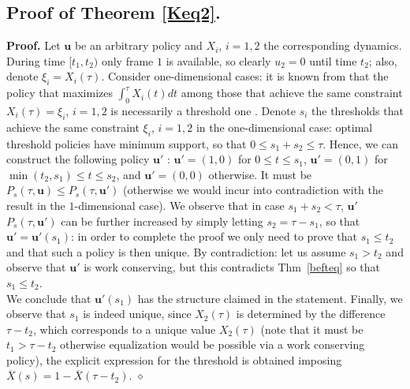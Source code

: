 \documentclass[10pt,twocolumn,conference,final]{IEEEtran}
\def\endpf{\hfill$\diamond$}
\newcommand{\Xu}{\overline X}
\newcommand{\ubf}{\mathbf u}
\begin{document}
\subsection{\bf Proof of Theorem \ref{Keq2}.}
{\bf Proof.} Let $\ubf$ be an arbitrary policy  and $X_i$, $i=1,2$ the corresponding
dynamics. During  time $[ t_1 , t_2)$ only frame $1$ is available, so clearly
$u_2=0$ until time $t_2$; also, denote $\xi_i=X_i(\tau)$. Consider
one-dimensional cases: it is known from \cite{ABD} that the
policy that maximizes $\int_{0}^{\tau} X_i (t)dt$ among those that
achieve the same constraint $X_i(\tau)= \xi_i$, $i=1,2$ is
necessarily a threshold one \cite{ABD}. Denote $s_i$ the
thresholds that achieve the same constraint $\xi_i$, $i=1,2$ in
the one-dimensional case: optimal threshold policies have minimum
support, so that $0\leq s_1+s_2\leq \tau$. Hence,
we can construct the following policy ${\ubf'}$ : ${\ubf'}=(1,0)$
for  $0\leq t \leq s_1$, ${\ubf'}=(0,1)$ for $\min(t_2,s_1)\leq t \leq s_2$,
and ${\ubf'}=(0,0)$ otherwise. It must be $P_s(\tau,\ubf)\leq P_s(\tau,{\ubf'})$
(otherwise we would incur into contradiction with the result \cite{ABD}
in the $1$-dimensional case). We observe that in case $s_1+s_2<\tau$,  ${\ubf'}$
$P_s(\tau,{\ubf'})$ can be further increased by simply letting $s_2=\tau-s_1$,
so that $\ubf'=\ubf'(s_1)$:  in order to complete the proof we only need to
prove that $s_1\leq t_2$ and that such a policy is then unique. By contradiction:
let us assume $s_1>t_2$ and observe that ${\ubf'}$ is work conserving, but this
contradicts Thm~\ref{befteq} so that $s_1 \leq t_2$. \\
We conclude that ${\ubf'}(s_1)$ has the structure claimed in the statement. Finally,
we observe that $s_1$ is indeed unique, since $X_2(\tau)$ is determined by the
difference $\tau-t_2$, which corresponds to a unique value $X_2(\tau)$ (note that
it must be $t_1>\tau-t_2$ otherwise equalization would be possible via a work
conserving policy), the explicit expression for the threshold is obtained
imposing $\Xu(s)=1-\Xu(\tau-t_2)$.
\endpf
\end{document}
